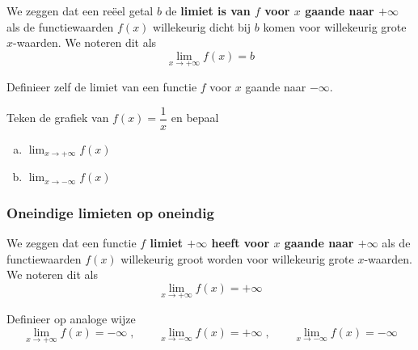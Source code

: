 \documentclass[12pt,twoside,a4paper]{article}
\newenvironment{definitie}
{
  \vspace{0.4cm}
  \begin{mdframed}[nobreak=true,frametitle={Definitie}]
  }{%
  \end{mdframed}
}
\begin{document}
\begin{definitie}
  We zeggen dat een reëel getal $b$ de {\bf limiet is van $f$ voor $x$ gaande naar $+\infty$} als de functiewaarden $f(x)$ willekeurig dicht bij $b$ komen voor willekeurig grote $x$-waarden. We noteren dit als
  $$\lim_{x\to +\infty} f(x)=b$$
\end{definitie}

\begin{oefening}
  Definieer zelf de limiet van een functie $f$ voor $x$ gaande naar $-\infty$.
\end{oefening}

\begin{oefening}
  Teken de grafiek van $f(x)=\dfrac{1}{x}$ en bepaal
  \begin{enumerate}[(a)]
  \itemsep.5em
  \item $\displaystyle \lim_{x\to +\infty} f(x)$
  \item $\displaystyle \lim_{x\to -\infty} f(x)$
  \end{enumerate}
\end{oefening}

\subsubsection*{Oneindige limieten op oneindig}

\begin{definitie}
  We zeggen dat een functie  {\bf $f$ limiet $+\infty$ heeft voor $x$ gaande naar $+\infty$} als de functiewaarden $f(x)$ willekeurig groot worden voor willekeurig grote $x$-waarden. We noteren dit als
  $$\lim_{x\to +\infty} f(x)=+\infty$$
\end{definitie}

\begin{oefening}
  Definieer op analoge wijze
  $$\lim_{x\to +\infty} f(x)=-\infty\;,\qquad\lim_{x\to -\infty} f(x)=+\infty\;,\qquad\lim_{x\to -\infty} f(x)=-\infty$$
\end{oefening}
\end{document}
